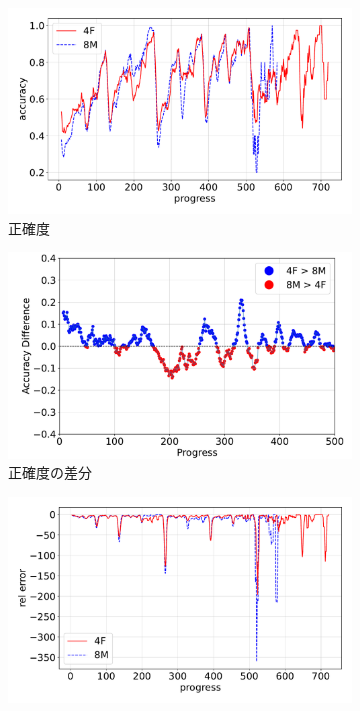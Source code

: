 \begin{figure}[t]
\centering
\begin{subfigure}[b]{0.49\linewidth}
    \includegraphics[width=\linewidth]{pdf/compare/EXP6_NT4F_and_NT8M/accuracy.pdf}
    \caption{正確度}
    \label{fig:EXP6_:NT4F_and_NT8M_accuracy}
\end{subfigure}
\begin{subfigure}[b]{0.49\linewidth}
    \includegraphics[width=\linewidth]{pdf/compare/EXP6_NT4F_and_NT8M/acc_diff_plot.pdf}
    \caption{正確度の差分}
    \label{fig:EXP6_NT4F_and_NT8M_acc_diff}
\end{subfigure}
\begin{subfigure}[b]{0.49\linewidth}
    \includegraphics[width=\linewidth]{pdf/compare/EXP6_NT4F_and_NT8M/error_abs.pdf}

\end{subfigure}
\end{figure}
